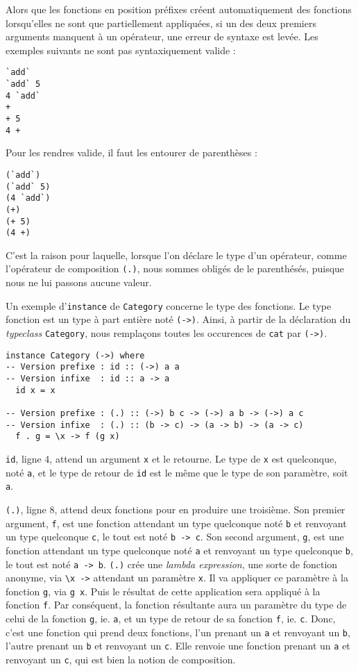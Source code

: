 \documentclass{llncs}
\begin{document}
Alors que les fonctions en position préfixes créent automatiquement des fonctions
lorsqu'elles ne sont que partiellement appliquées, si un des deux premiers arguments
manquent à un opérateur, une erreur de syntaxe est levée.
Les exemples suivants ne sont pas syntaxiquement valide :
\begin{lstlisting}
`add`
`add` 5
4 `add`
+
+ 5
4 +
\end{lstlisting}

Pour les rendres valide, il faut les entourer de parenthèses :
\begin{lstlisting}
(`add`)
(`add` 5)
(4 `add`)
(+)
(+ 5)
(4 +)
\end{lstlisting}

C'est la raison pour laquelle, lorsque l'on déclare le type d'un opérateur, comme
l'opérateur de composition \lstinline{(.)}, nous sommes obligés de le parenthésés,
puisque nous ne lui passons aucune valeur.

Un exemple d'\lstinline{instance} de \lstinline{Category} concerne le type des fonctions.
Le type fonction est un type à part entière noté \lstinline{(->)}.
Ainsi, à partir de la déclaration du \emph{typeclass} \lstinline{Category}, nous
remplaçons toutes les occurences de \lstinline{cat} par \lstinline{(->)}.
\begin{lstlisting}
instance Category (->) where
-- Version prefixe : id :: (->) a a
-- Version infixe  : id :: a -> a
  id x = x

-- Version prefixe : (.) :: (->) b c -> (->) a b -> (->) a c
-- Version infixe  : (.) :: (b -> c) -> (a -> b) -> (a -> c)
  f . g = \x -> f (g x)
\end{lstlisting}

\lstinline{id}, ligne 4, attend un argument \lstinline{x} et le retourne.
Le type de \lstinline{x} est quelconque, noté \lstinline{a}, et le type de retour
de \lstinline{id} est le même que le type de son paramètre, soit \lstinline{a}.

\lstinline{(.)}, ligne 8, attend deux fonctions pour en produire une troisième.
Son premier argument, \lstinline{f}, est une fonction attendant un type quelconque
noté \lstinline{b} et renvoyant un type quelconque \lstinline{c}, le tout est
noté \lstinline{b -> c}.
Son second argument, \lstinline{g}, est une fonction attendant un type quelconque
noté \lstinline{a} et renvoyant un type quelconque \lstinline{b}, le tout est
noté \lstinline{a -> b}.
\lstinline{(.)} crée une \emph{lambda expression}, une sorte de fonction anonyme,
via \lstinline{\x ->} attendant un paramètre \lstinline{x}.
Il va appliquer ce paramètre à la fonction \lstinline{g}, via \lstinline{g x}.
Puis le résultat de cette application sera appliqué à la fonction \lstinline{f}.
Par conséquent, la fonction résultante aura un paramètre du type de celui de la
fonction \lstinline{g}, ie. \lstinline{a}, et un type de retour de sa fonction \lstinline{f},
ie. \lstinline{c}.
Donc, c'est une fonction qui prend deux fonctions, l'un prenant un \lstinline{a}
et renvoyant un \lstinline{b}, l'autre prenant un \lstinline{b} et renvoyant un \lstinline{c}.
Elle renvoie une fonction prenant un \lstinline{a} et renvoyant un \lstinline{c},
qui est bien la notion de composition.
\end{document}

